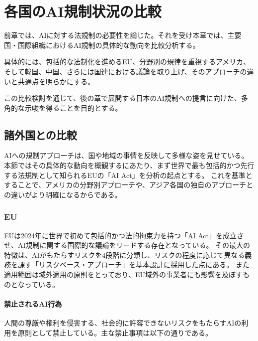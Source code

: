 \chapter{各国のAI規制状況の比較}

前章では、AIに対する法規制の必要性を論じた。それを受け本章では、主要国・国際組織におけるAI規制の具体的な動向を比較分析する。

具体的には、包括的な法制化を進めるEU、分野別の規律を重視するアメリカ、そして韓国、中国、さらには国連における議論を取り上げ、そのアプローチの違いと共通点を明らかにする。

この比較検討を通じて、後の章で展開する日本のAI規制への提言に向けた、多角的な示唆を得ることを目的とする。

\section{諸外国との比較}

AIへの規制アプローチは、国や地域の事情を反映して多様な姿を見せている。本節ではその具体的な動向を概観するにあたり、まず世界で最も包括的かつ先行する法規制として知られるEUの「AI Act」を分析の起点とする。
これを基準とすることで、アメリカの分野別アプローチや、アジア各国の独自のアプローチとの違いがより明確になるからである。

\subsection{EU}
EUは2024年に世界で初めて包括的かつ法的拘束力を持つ「AI Act」を成立させ、AI規制に関する国際的な議論をリードする存在となっている。
その最大の特徴は、AIがもたらすリスクを4段階に分類し、リスクの程度に応じて異なる義務を課す「リスクベース・アプローチ」を基本設計に採用した点にある。
また適用範囲は域外適用の原則をとっており、EU域外の事業者にも影響を及ぼすものとなっている。

\subsubsection{禁止されるAI行為}
人間の尊厳や権利を侵害する、社会的に許容できないリスクをもたらすAIの利用を原則として禁止している。主な禁止事項は以下の通りである。


